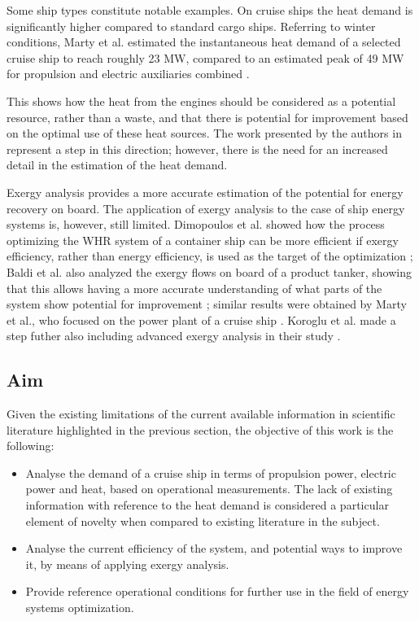 \documentclass[preprint,12pt]{elsarticle}
\begin{document}
Some ship types constitute notable examples. On cruise ships the heat demand is significantly higher compared to standard cargo ships. Referring to winter conditions, Marty et al. estimated the instantaneous heat demand of a selected cruise ship to reach roughly 23 MW, compared to an estimated peak of 49 MW for propulsion and electric auxiliaries combined \cite{Marty2012}.  


This shows how the heat from the engines should be considered as a potential resource, rather than a waste, and that there is potential for improvement based on the optimal use of these heat sources. The work presented by the authors in \cite{Baldi2016} represent a step in this direction; however, there is the need for an increased detail in the estimation of the heat demand. 

Exergy analysis provides a more accurate estimation of the potential for energy recovery on board. The application of exergy analysis to the case of ship energy systems is, however, still limited. Dimopoulos et al. showed how the process optimizing the WHR system of a container ship can be more efficient if exergy efficiency, rather than energy efficiency, is used as the target of the optimization \cite{Dimopoulos2012}; Baldi et al. also analyzed the exergy flows on board of a product tanker, showing that this allows having a more accurate understanding of what parts of the system show potential for improvement \cite{Baldi2015a}; similar results were obtained by Marty et al., who focused on the power plant of a cruise ship \cite{Marty2016}. Koroglu et al. made a step futher also including advanced exergy analysis in their study \cite{Koroglu2017}.



\subsection{Aim}

Given the existing limitations of the current available information in scientific literature highlighted in the previous section, the objective of this work is the following:
\begin{itemize}
	\item Analyse the demand of a cruise ship in terms of propulsion power, electric power and heat, based on operational measurements. The lack of existing information with reference to the heat demand is considered a particular element of novelty when compared to existing literature in the subject.
	\item Analyse the current efficiency of the system, and potential ways to improve it, by means of applying exergy analysis.
	\item Provide reference operational conditions for further use in the field of energy systems optimization.
\end{itemize}
\end{document}

